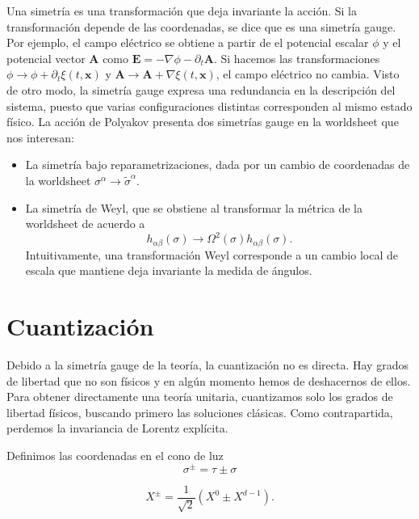 Una simetría es una transformación que deja invariante la acción. 
Si la transformación depende de las coordenadas, se dice que es una simetría gauge. 
Por ejemplo, el campo eléctrico se obtiene a partir de el potencial escalar $\phi$ y
el potencial vector $\mathbf A$ como $\mathbf E = -\nabla \phi - \partial_t \mathbf A$.
Si hacemos las transformaciones $\phi \to \phi + \partial_t \xi(t,\mathbf x)$ y 
$\mathbf A \to \mathbf A + \nabla \xi(t,\mathbf x)$, el campo eléctrico no cambia.
Visto de otro modo, la simetría gauge expresa una redundancia en la descripción del sistema,  
puesto que varias configuraciones distintas corresponden al mismo estado físico.
La acción de Polyakov presenta dos simetrías gauge en la worldsheet que nos interesan:
\begin{itemize}
  \item La simetría bajo reparametrizaciones, dada por un cambio de coordenadas de la worldsheet $\sigma^\alpha \to \tilde \sigma^\alpha$. 
  \item La simetría de Weyl, que se obstiene al transformar la métrica de la worldsheet de acuerdo 
    a
    \begin{equation}
      h_{\alpha\beta}(\sigma) \to \Omega^2(\sigma) h_{\alpha\beta}(\sigma).
    \end{equation}
    Intuitivamente, una transformación Weyl corresponde a un cambio local de escala que mantiene
    deja invariante la medida de ángulos.
\end{itemize}



\section{Cuantización}

Debido a la simetría gauge de la teoría, la cuantización no es directa.
Hay grados de libertad que no son físicos y en algún momento hemos de deshacernos de ellos.
Para obtener directamente una teoría unitaria, cuantizamos solo los grados de libertad 
físicos, buscando primero las soluciones clásicas. 
Como contrapartida, perdemos la invariancia de Lorentz explícita.

Definimos las coordenadas en el cono de luz
\begin{equation}
  \sigma^\pm=\tau\pm\sigma
\end{equation}

\begin{equation}
  X^\pm=\frac{1}{\sqrt 2} (X^0 \pm X^{d-1}).
\end{equation}


